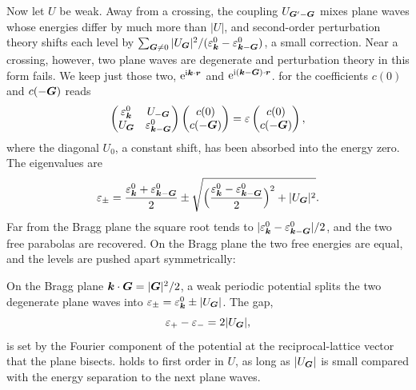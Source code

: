 Now let $U$ be weak. Away from a crossing, the coupling $U_{\bm{G}'-\bm{G}}$ mixes plane waves whose energies differ by much more than $|U|$, and second-order perturbation theory shifts each level by $\sum_{\bm{G}\neq0}|U_{\bm{G}}|^2/(\varepsilon^0_{\bm{k}} - \varepsilon^0_{\bm{k}-\bm{G}})$, a small correction. Near a crossing, however, two plane waves are degenerate and perturbation theory in this form fails. We keep just those two, $\mathrm{e}^{\mathrm{i}\bm{k}\cdot\bm{r}}$ and $\mathrm{e}^{\mathrm{i}(\bm{k}-\bm{G})\cdot\bm{r}}$.  for the coefficients $c(0)$ and $c(-\bm{G})$ reads
\begin{equation}
  \begin{pmatrix} \varepsilon^0_{\bm{k}} & U_{-\bm{G}} \\ U_{\bm{G}} & \varepsilon^0_{\bm{k}-\bm{G}} \end{pmatrix}
  \begin{pmatrix} c(0) \\ c(-\bm{G}) \end{pmatrix} = \varepsilon \begin{pmatrix} c(0) \\ c(-\bm{G}) \end{pmatrix},
  \label{eq:3.2-twowave}
\end{equation}
where the diagonal $U_0$, a constant shift, has been absorbed into the energy zero. The eigenvalues are
\begin{equation}
  \varepsilon_\pm = \frac{\varepsilon^0_{\bm{k}} + \varepsilon^0_{\bm{k}-\bm{G}}}{2} \pm \sqrt{\Bigl(\frac{\varepsilon^0_{\bm{k}} - \varepsilon^0_{\bm{k}-\bm{G}}}{2}\Bigr)^2 + |U_{\bm{G}}|^2} .
  \label{eq:3.2-epm}
\end{equation}
Far from the Bragg plane the square root tends to $|\varepsilon^0_{\bm{k}} - \varepsilon^0_{\bm{k}-\bm{G}}|/2$, and the two free parabolas are recovered. On the Bragg plane the two free energies are equal, and the levels are pushed apart symmetrically:
\begin{keyresult}
On the Bragg plane $\bm{k}\cdot\bm{G} = |\bm{G}|^2/2$, a weak periodic potential splits the two degenerate plane waves into $\varepsilon_\pm = \varepsilon^0_{\bm{k}} \pm |U_{\bm{G}}|$. The gap,
\begin{equation}
  \varepsilon_+ - \varepsilon_- = 2|U_{\bm{G}}| ,
  \label{eq:3.2-gap}
\end{equation}
is set by the Fourier component of the potential at the reciprocal-lattice vector that the plane bisects.  holds to first order in $U$, as long as $|U_{\bm{G}}|$ is small compared with the energy separation to the next plane waves.
\end{keyresult}

